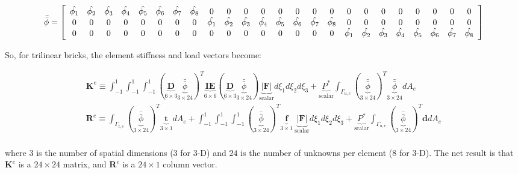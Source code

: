 \documentclass[10pt]{article}
\begin{document}
\begin{equation}
\bar{\bar{\phi}}=\left\lbrack\begin{array}{*{24}c}
\hat{\phi_1} & \hat{\phi_2} & \hat{\phi_3} & \hat{\phi_4} & \hat{\phi_5} & \hat{\phi_6} & \hat{\phi_7} & \hat{\phi_8} & 0 & 0 & 0 & 0 & 0 & 0 & 0 & 0 & 0 & 0 & 0 & 0 & 0 & 0 & 0 & 0\\
 0 & 0 & 0 & 0 & 0 & 0 & 0 & 0 & \hat{\phi_1} & \hat{\phi_2} & \hat{\phi_3} & \hat{\phi_4} & \hat{\phi_5} & \hat{\phi_6} & \hat{\phi_7} & \hat{\phi_8} & 0 & 0 & 0 & 0 & 0 & 0 & 0 & 0\\
  0 & 0 & 0 & 0 & 0 & 0 & 0 & 0 & 0 & 0 & 0 & 0 & 0 & 0 & 0 & 0 & \hat{\phi_1} & \hat{\phi_2} & \hat{\phi_3} & \hat{\phi_4} & \hat{\phi_5} & \hat{\phi_6} & \hat{\phi_7} & \hat{\phi_8}\\
\end{array}\right\rbrack
\end{equation}

So, for trilinear bricks, the element stiffness and load vectors become:

\begin{equation}
\label{eq:FEWeakForm_element2}
\begin{aligned}
\textbf{K}^e\equiv\int_{-1}^{1}\int_{-1}^{1}\int_{-1}^{1}(\underbrace{\textbf{D}}_{6\times3}\underbrace{\bar{\bar{\phi}}}_{3\times24})^T\underbrace{\textbf{IE}}_{6\times6}(\underbrace{\textbf{D}}_{6\times3}\underbrace{\bar{\bar{\phi}}}_{3\times24})\underbrace{|\textbf{F}|}_\text{scalar}d\xi_1d\xi_2d\xi_3 +\underbrace{P^{*}}_\text{scalar}\int_{\Gamma_{u,e}}(\underbrace{\bar{\bar{\phi}}}_{3\times24})^T\underbrace{\bar{\bar{\phi}}}_{3\times24}dA_e\\
\textbf{R}^e\equiv\int_{\Gamma_{t,e}}(\underbrace{\bar{\bar{\phi}}}_{3\times24})^T\underbrace{\textbf{t}}_{3\times1}dA_e+\int_{-1}^{1}\int_{-1}^{1}\int_{-1}^{1}(\underbrace{\bar{\bar{\phi}}}_{3\times24})^T\underbrace{\textbf{f}}_{3\times1}\ \underbrace{|\textbf{F}|}_\text{scalar}d\xi_1d\xi_2d\xi_3+\underbrace{P^{*}}_\text{scalar}\int_{\Gamma_{u,e}}(\underbrace{\bar{\bar{\phi}}}_{3\times24})^T\textbf{d}dA_e\\
\end{aligned}
\end{equation}

where \(3\) is the number of spatial dimensions (3 for 3-D) and \(24\) is the number of unknowns per element (8 for 3-D). The net result is that \(\textbf{K}^e\) is a \(24\times24\) matrix, and \(\textbf{R}^e\) is a \(24\times1\) column vector. 
\end{document}
